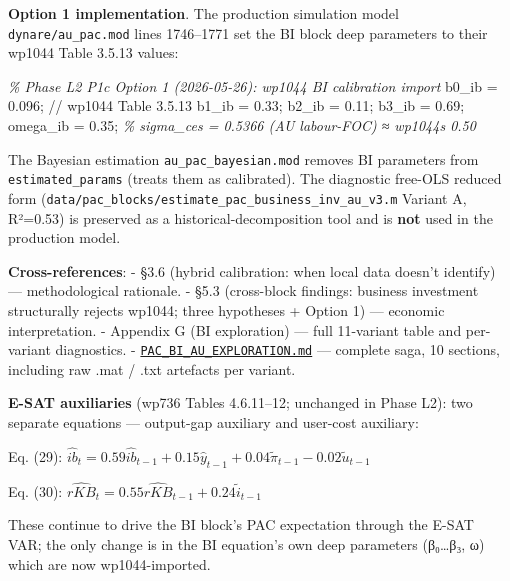 \documentclass[
]{article}
\newenvironment{Shaded}{}{}
\newcommand{\CommentTok}[1]{\textcolor[rgb]{0.38,0.63,0.69}{\textit{#1}}}
\newcommand{\FloatTok}[1]{\textcolor[rgb]{0.25,0.63,0.44}{#1}}
\newcommand{\OperatorTok}[1]{\textcolor[rgb]{0.40,0.40,0.40}{#1}}
\newcommand{\VariableTok}[1]{\textcolor[rgb]{0.10,0.09,0.49}{#1}}
\begin{document}
\textbf{Option 1 implementation}. The production simulation model
\texttt{dynare/au\_pac.mod} lines 1746--1771 set the BI block deep
parameters to their wp1044 Table 3.5.13 values:

\begin{Shaded}
\begin{Highlighting}[]
\CommentTok{\% Phase L2 P1c Option 1 (2026{-}05{-}26): wp1044 BI calibration import}
\VariableTok{b0\_ib} \OperatorTok{=} \FloatTok{0.096}\OperatorTok{;}   \OperatorTok{//} \VariableTok{wp1044} \VariableTok{Table} \FloatTok{3.5.13}
\VariableTok{b1\_ib} \OperatorTok{=} \FloatTok{0.33}\OperatorTok{;}
\VariableTok{b2\_ib} \OperatorTok{=} \FloatTok{0.11}\OperatorTok{;}
\VariableTok{b3\_ib} \OperatorTok{=} \FloatTok{0.69}\OperatorTok{;}
\VariableTok{omega\_ib} \OperatorTok{=} \FloatTok{0.35}\OperatorTok{;}
\CommentTok{\% sigma\_ces = 0.5366 (AU labour{-}FOC) ≈ wp1044\textquotesingle{}s 0.50}
\end{Highlighting}
\end{Shaded}

The Bayesian estimation \texttt{au\_pac\_bayesian.mod} removes BI
parameters from \texttt{estimated\_params} (treats them as calibrated).
The diagnostic free-OLS reduced form
(\texttt{data/pac\_blocks/estimate\_pac\_business\_inv\_au\_v3.m}
Variant A, R²=0.53) is preserved as a historical-decomposition tool and
is \textbf{not} used in the production model.

\textbf{Cross-references}: - §3.6 (hybrid calibration: when local data
doesn't identify) --- methodological rationale. - §5.3 (cross-block
findings: business investment structurally rejects wp1044; three
hypotheses + Option 1) --- economic interpretation. - Appendix G (BI
exploration) --- full 11-variant table and per-variant diagnostics. -
\href{../PAC_BI_AU_EXPLORATION.md}{\texttt{PAC\_BI\_AU\_EXPLORATION.md}}
--- complete saga, 10 sections, including raw .mat / .txt artefacts per
variant.

\textbf{E-SAT auxiliaries} (wp736 Tables 4.6.11--12; unchanged in Phase
L2): two separate equations --- output-gap auxiliary and user-cost
auxiliary:

Eq. (29):
\(\widehat{ib}_t = 0.59 \widehat{ib}_{t-1} + 0.15 \hat{y}_{t-1} + 0.04 \tilde{\pi}_{t-1} - 0.02 \tilde{u}_{t-1}\)

Eq. (30):
\(\widehat{rKB}_t = 0.55 \widehat{rKB}_{t-1} + 0.24 \tilde{i}_{t-1}\)

These continue to drive the BI block's PAC expectation through the E-SAT
VAR; the only change is in the BI equation's own deep parameters
(β₀\ldots β₃, ω) which are now wp1044-imported.
\end{document}
